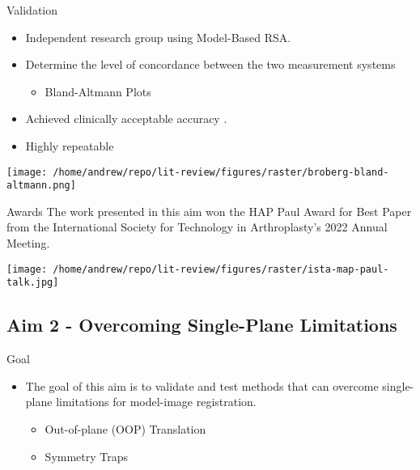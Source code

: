 \documentclass[presentation, aspectratio=1610]{beamer}
\begin{document}
\begin{frame}[label={sec:org7d6a18e}]{Validation}
\begin{itemize}
\item Independent research group using Model-Based RSA.
\item Determine the level of concordance between the two measurement systems
\begin{itemize}
\item Bland-Altmann Plots
\end{itemize}
\item Achieved clinically acceptable accuracy \autocites{brobergValidationMachineLearning2023}[][]{jensenJointTrackMachine2022}.
\item Highly repeatable
\end{itemize}

\begin{center}
\texttt{[image: /home/andrew/repo/lit-review/figures/raster/broberg-bland-altmann.png]}
\end{center}
\end{frame}
\begin{frame}[label={sec:orgc0a34b4}]{Awards}
The work presented in this aim won the HAP Paul Award for Best Paper from the International Society for Technology in Arthroplasty's 2022 Annual Meeting.
\begin{center}
\texttt{[image: /home/andrew/repo/lit-review/figures/raster/ista-map-paul-talk.jpg]}
\end{center}
\end{frame}
\subsection{Aim 2 - Overcoming Single-Plane Limitations}
\label{sec:org44b998f}
\begin{frame}[label={sec:org2652051}]{Goal}
\begin{itemize}
\item The goal of this aim is to validate and test methods that can overcome single-plane limitations for model-image registration.
\begin{itemize}
\item Out-of-plane (OOP) Translation
\item Symmetry Traps
\end{itemize}
\end{itemize}
\end{frame}
\end{document}
